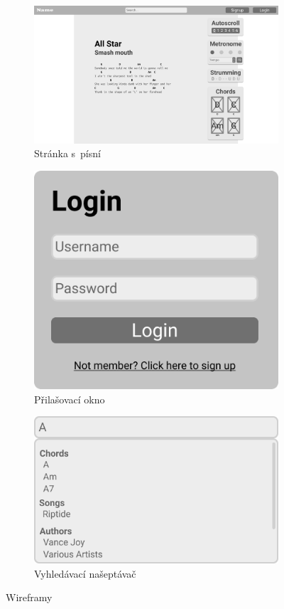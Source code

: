 \begin{figure}
    \centering
    \begin{subfigure}{\textwidth}
        \centering
        \includegraphics[width=\textwidth]{assets/song_page.png}
        \caption{Stránka s~písní}
        \label{fig:song_page}
    \end{subfigure}
    \par\bigskip
    \begin{subfigure}{.49\textwidth}
        \centering
        \includegraphics[width=.7\textwidth]{assets/login.png}
        \caption{Přilašovací okno}
        \label{fig:login_modal}
    \end{subfigure}
    \begin{subfigure}{.49\textwidth}
        \centering
        \includegraphics[width=.9\textwidth]{assets/search.png}
        \caption{Vyhledávací našeptávač}
        \label{fig:search}
    \end{subfigure}
    \caption{Wireframy}
    \label{fig:wireframes}
\end{figure}

